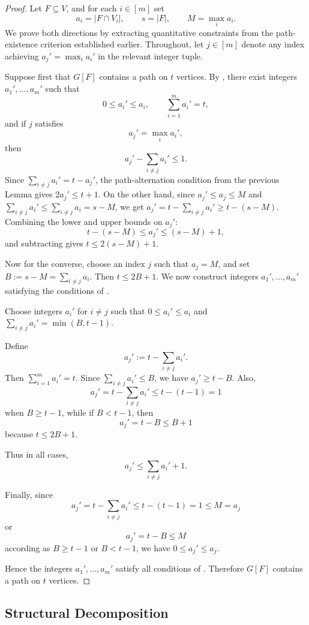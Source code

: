 \documentclass[12pt,reqno]{amsart}
\theoremstyle{definition}
\begin{document}
\begin{proof}
Let $F \subseteq V$, and for each $i \in [m]$ set
\[
a_i = |F \cap V_i|,\qquad
s = |F|,\qquad
M = \max_i a_i.
\]
We prove both directions by extracting quantitative constraints from the path-existence criterion established earlier. 
Throughout, let $j\in [m]$ denote any index achieving $a_j'=\max_i a_i'$ in the relevant integer tuple.


\smallskip

Suppose first that $G[F]$ contains a path on $t$ vertices.
By , there exist integers $a_1',\dots,a_m'$ such that
\[
0 \le a_i' \le a_i,\qquad
\sum_{i=1}^m a_i' = t,
\]
and if $j$ satisfies
\[
a_j' = \max_i a_i',
\]
then
\[
a_j' - \sum_{i\neq j} a_i' \le 1.
\]
Since $\sum_{i\neq j} a_i' = t-a_j'$, the path-alternation condition from the previous Lemma gives $2a_j'\leq t+1$. 
On the other hand, since $a_j'\leq a_j\leq M$ and $\sum_{i\neq j}a_i'\leq \sum_{i\neq j} a_i = s - M$, we get $a_j' = t-\sum_{i\neq j} a_i'\geq t-(s-M)$. 
Combining the lower and upper bounds on $a_j'$:
\[
t-(s-M) \leq a_j' \leq (s-M) +1,
\]
and subtracting gives $t\leq 2(s-M)+1$. 

\smallskip

Now for the converse, choose an index $j$ such that $a_j=M$, and set $B := s-M = \sum_{i\neq j} a_i$.
Then $t \le 2B+1$. 
We now construct integers $a_1',\dots,a_m'$ satisfying the conditions of .

Choose integers $a_i'$ for $i\neq j$ such that $0 \le a_i' \le a_i$ and 
$\sum_{i\neq j} a_i' = \min(B,t-1)$.

Define
\[
a_j' := t-\sum_{i\neq j} a_i'.
\]
Then $\sum_{i=1}^m a_i' = t$.
Since $\sum_{i\neq j} a_i' \le B$,
we have $a_j' \ge t-B$. 
Also,
\[
a_j'
=
t-\sum_{i\neq j} a_i'
\le
t-(t-1)=1
\]
when $B\ge t-1$, while if $B<t-1$, then
\[
a_j'=t-B \le B+1
\]
because $t\le 2B+1$.

Thus in all cases,
\[
a_j' \le \sum_{i\neq j} a_i' +1.
\]

Finally, since
\[
a_j'=t-\sum_{i\neq j} a_i' \le t-(t-1)=1 \le M=a_j
\]
or
\[
a_j'=t-B \le M
\]
according as $B\ge t-1$ or $B<t-1$, we have
$0\le a_j' \le a_j$.

Hence the integers $a_1',\dots,a_m'$ satisfy all conditions of . 
Therefore $G[F]$ contains a path on $t$ vertices.
\end{proof}

\subsection{Structural Decomposition}
\end{document}
